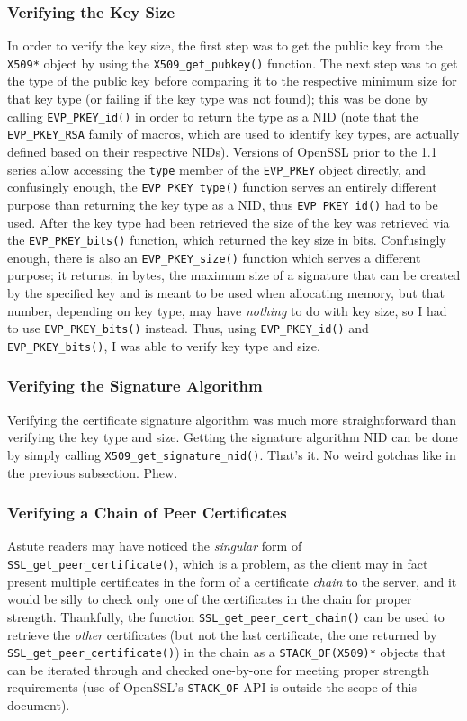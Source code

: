 \documentclass{article}
\begin{document}
\subsubsection{Verifying the Key Size}
In order to verify the key size, the first step was to get the public key from the \texttt{X509*} object by using the \texttt{X509_get_pubkey()} function.  The next step was to get the type of the public key before comparing it to the respective minimum size for that key type (or failing if the key type was not found); this was be done by calling \texttt{EVP_PKEY_id()} in order to return the type as a NID (note that the \texttt{EVP_PKEY_RSA} family of macros, which are used to identify key types, are actually defined based on their respective NIDs).  Versions of OpenSSL prior to the 1.1 series allow accessing the \texttt{type} member of the \texttt{EVP_PKEY} object directly, and confusingly enough, the \texttt{EVP_PKEY_type()} function serves an entirely different purpose than returning the key type as a NID, thus \texttt{EVP_PKEY_id()} had to be used.  After the key type had been retrieved the size of the key was retrieved via the \texttt{EVP_PKEY_bits()} function, which returned the key size in bits. Confusingly enough, there is also an \texttt{EVP_PKEY_size()} function which serves a different purpose; it returns, in bytes, the maximum size of a signature that can be created by the specified key and is meant to be used when allocating memory, but that number, depending on key type, may have \emph{nothing} to do with key size, so I had to use \texttt{EVP_PKEY_bits()} instead.  Thus, using \texttt{EVP_PKEY_id()} and \texttt{EVP_PKEY_bits()}, I was able to verify key type and size.

\subsubsection{Verifying the Signature Algorithm}
Verifying the certificate signature algorithm was much more straightforward than verifying the key type and size.  Getting the signature algorithm NID can be done by simply calling \texttt{X509_get_signature_nid()}.  That's it.  No weird gotchas like in the previous subsection.  Phew.

\subsubsection{Verifying a Chain of Peer Certificates}
Astute\label{2018-03-05-cert-chain} readers may have noticed the \emph{singular} form of \texttt{SSL_get_peer_certificate()}, which is a problem, as the client may in fact present multiple certificates in the form of a certificate \emph{chain} to the server, and it would be silly to check only one of the certificates in the chain for proper strength.  Thankfully, the function \texttt{SSL_get_peer_cert_chain()} can be used to retrieve the \emph{other} certificates (but not the last certificate, the one returned by \texttt{SSL_get_peer_certificate()}) in the chain as a \texttt{STACK_OF(X509)*} objects that can be iterated through and checked one-by-one for meeting proper strength requirements (use of OpenSSL's \texttt{STACK_OF} API is outside the scope of this document).
\end{document}
